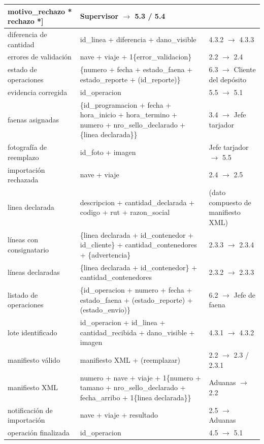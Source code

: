 {\begin{longtable}{|L{3.4cm}|L{7.2cm}|L{4.0cm}|}
motivo\_rechazo * rechazo *] & Supervisor $\rightarrow$ 5.3 / 5.4 \\ \hline
diferencia de cantidad & id\_linea + diferencia + dano\_visible & 4.3.2 $\rightarrow$ 4.3.3
\\ \hline
errores de validación & nave + viaje + 1\{error\_validacion\} & 2.2 $\rightarrow$ 2.4 \\
\hline
estado de operaciones & \{numero + fecha + estado\_faena + estado\_reporte + (id\_reporte)\}
& 6.3 $\rightarrow$ Cliente del depósito \\ \hline
evidencia corregida & id\_operacion & 5.5 $\rightarrow$ 5.1 \\ \hline
faenas asignadas & \{id\_programacion + fecha + hora\_inicio + hora\_termino + numero +
nro\_sello\_declarado + \{linea declarada\}\} & 3.4 $\rightarrow$ Jefe tarjador \\ \hline
fotografía de reemplazo & id\_foto + imagen & Jefe tarjador $\rightarrow$ 5.5 \\ \hline
importación rechazada & nave + viaje & 2.4 $\rightarrow$ 2.5 \\ \hline
linea declarada & descripcion + cantidad\_declarada + codigo + rut + razon\_social & (dato
compuesto de manifiesto XML) \\ \hline
líneas con consignatario & \{linea declarada + id\_contenedor + id\_cliente\} +
cantidad\_contenedores + \{advertencia\} & 2.3.3 $\rightarrow$ 2.3.4 \\ \hline
líneas declaradas & \{linea declarada + id\_contenedor\} + cantidad\_contenedores & 2.3.2
$\rightarrow$ 2.3.3 \\ \hline
listado de operaciones & \{id\_operacion + numero + fecha + estado\_faena +
(estado\_reporte) + (estado\_envio)\} & 6.2 $\rightarrow$ Jefe de faena \\ \hline
lote identificado & id\_operacion + id\_linea + cantidad\_recibida + dano\_visible + imagen &
4.3.1 $\rightarrow$ 4.3.2 \\ \hline
manifiesto válido & manifiesto XML + (reemplazar) & 2.2 $\rightarrow$ 2.3 / 2.3.1 \\ \hline
manifiesto XML & numero + nave + viaje + 1\{numero + tamano + nro\_sello\_declarado +
fecha\_arribo + 1\{linea declarada\}\} & Aduanas $\rightarrow$ 2.2 \\ \hline
notificación de importación & nave + viaje + resultado & 2.5 $\rightarrow$ Aduanas \\ \hline
operación finalizada & id\_operacion & 4.5 $\rightarrow$ 5.1 \\ \hline

\end{longtable}}
